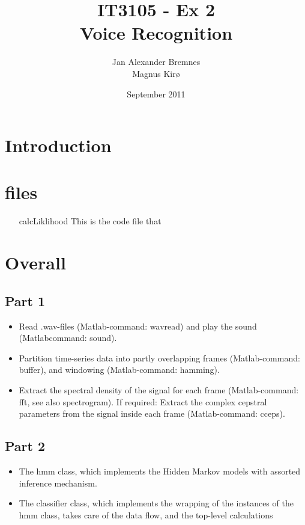 \documentclass[titlepage]{article}
\author{Jan Alexander Bremnes\\Magnus Kirø}
\title{IT3105 - Ex 2\\Voice Recognition}
\date{September 2011}
\begin{document}
    \maketitle
    \tableofcontents
    \newpage

\section{Introduction}

\section{files}
\begin{itemize}
\item[calcLiklihood] This is the code file that 
\end{itemize}

	
\section{Overall}
	\subsection{Part 1}
\begin{itemize}
\item Read .wav-ﬁles (Matlab-command: wavread) and play the sound (Matlabcommand: sound).
\item Partition time-series data into partly overlapping frames (Matlab-command: buffer), and windowing (Matlab-command: hamming).
\item Extract the spectral density of the signal for each frame (Matlab-command: fft, see also spectrogram). If required: Extract the complex cepstral parameters from the signal inside each frame (Matlab-command: cceps).
\end{itemize}

	\subsection{Part 2}
\begin{itemize}
\item The hmm class, which implements the Hidden Markov models with assorted inference mechanism.
\item The classifier class, which implements the wrapping of the instances of the hmm class, takes care of the data ﬂow, and the top-level calculations
\end{itemize}	
\end{document}
